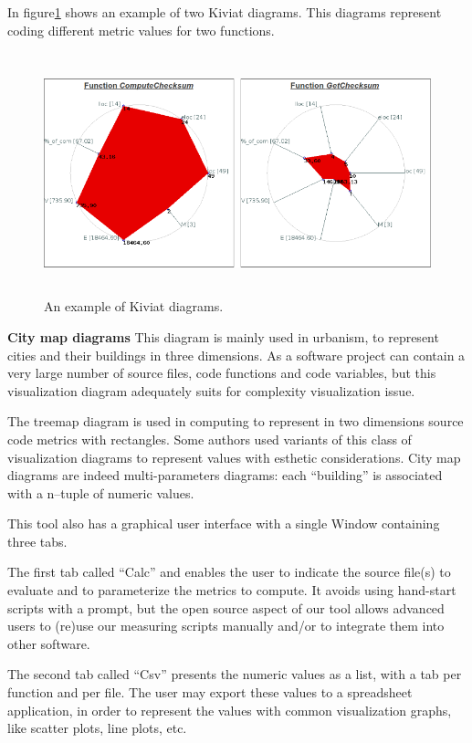 In figure\ref{fig:metrix} shows an example of two Kiviat diagrams. This diagrams represent coding different metric values for two functions. 

\begin{figure}[h]
	\centering
	\includegraphics[height=70mm]{figures/metrix.png}
	\caption{An example of Kiviat diagrams.}
	\label{fig:metrix}
\end{figure}

\textbf{City map diagrams}
This  diagram  is mainly  used  in  urbanism,  to  represent  cities  and  their  buildings  in  three  dimensions.  As  a  software  project  can  
contain  a  very  large  number  of  source  files,  code  functions  and  code  variables, but this visualization diagram adequately suits for complexity visualization issue. 

The  treemap  diagram  is  used  in  computing  to represent  in  two  dimensions  source  code  metrics  with  rectangles.  Some  authors  used  variants  of  this  class  of  visualization  diagrams  to  represent  values  with  esthetic  considerations. City  map  diagrams  are  indeed  multi-parameters  diagrams:  each  “building”  is  associated  with  a  n–tuple of numeric values.  

This tool also has a graphical user interface with a single Window containing three tabs.

The first tab called “Calc” and enables the user to indicate the source file(s) to evaluate and to parameterize the metrics to compute. It avoids using hand-start scripts with a prompt, but the open source aspect 
of our tool  allows  advanced  users  to (re)use  our measuring scripts  manually  and/or to  integrate them into other software.

The second tab called “Csv” presents the numeric values as a list, with a tab per function and per file. The  user  may  export  these  values  to  a  spreadsheet  application,  in  order  to  represent  the  values  with  common visualization graphs, like scatter plots, line plots, etc.

